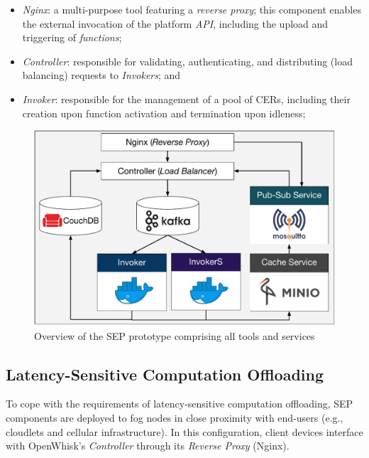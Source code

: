 \begin{itemize}

    \item \textit{Nginx}: a multi-purpose tool featuring a \textit{reverse proxy}; this component enables the external invocation of the platform \textit{API}, including the upload and triggering of \textit{functions};
    
    \item \textit{Controller}: responsible for validating, authenticating, and distributing (load balancing) requests to \textit{Invokers}; and 
    
    \item \textit{Invoker}: responsible for the management of a pool of CERs, including their creation upon function activation and termination upon idleness;
    
    
    
\end{itemize}

\begin{figure}[tbp]
	\centering
	\includegraphics[width=1\linewidth]{Figs/Serverless_Edge_Platform_Prototype.pdf}
	\caption{Overview of the SEP prototype comprising all tools and services}
	\label{fig:Serverless_Edge_Platform_Overview}
\end{figure}

\subsection{Latency-Sensitive Computation Offloading}

To cope with the requirements of latency-sensitive computation offloading, SEP components are deployed to fog nodes in close proximity with end-users (e.g., cloudlets and cellular infrastructure). In this configuration, client devices interface with  OpenWhisk's \textit{Controller} through its \textit{Reverse Proxy} (Nginx).

